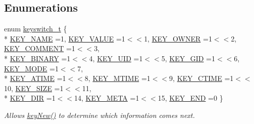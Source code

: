 \subsection*{Enumerations}
\begin{DoxyCompactItemize}
\item 
enum \hyperlink{group__key_ga91fb3178848bd682000958089abbaf40}{keyswitch\+\_\+t} \{ \\*
\hyperlink{group__key_gga91fb3178848bd682000958089abbaf40ad6127fc38f96410bf7c8f6e93b0397da}{K\+E\+Y\+\_\+\+N\+A\+M\+E} =1, 
\hyperlink{group__key_gga91fb3178848bd682000958089abbaf40ac66e4a49d09212b79f5754ca6db5bd2e}{K\+E\+Y\+\_\+\+V\+A\+L\+U\+E} =1$<$$<$1, 
\hyperlink{group__key_gga91fb3178848bd682000958089abbaf40a77ca60362fa8daca8d5347db4385068b}{K\+E\+Y\+\_\+\+O\+W\+N\+E\+R} =1$<$$<$2, 
\hyperlink{group__key_gga91fb3178848bd682000958089abbaf40ac29427bb47cc31689d02912e36161ee3}{K\+E\+Y\+\_\+\+C\+O\+M\+M\+E\+N\+T} =1$<$$<$3, 
\\*
\hyperlink{group__key_gga91fb3178848bd682000958089abbaf40a1ca18d4e094ae7487d35ecedda2235ff}{K\+E\+Y\+\_\+\+B\+I\+N\+A\+R\+Y} =1$<$$<$4, 
\hyperlink{group__key_gga91fb3178848bd682000958089abbaf40a28f01a87d65f065172f734c9c9446c0e}{K\+E\+Y\+\_\+\+U\+I\+D} =1$<$$<$5, 
\hyperlink{group__key_gga91fb3178848bd682000958089abbaf40ac0628bbaba7c837ca73323681393d15f}{K\+E\+Y\+\_\+\+G\+I\+D} =1$<$$<$6, 
\hyperlink{group__key_gga91fb3178848bd682000958089abbaf40a1b0a91ff3a855d6993930ebf0abaa518}{K\+E\+Y\+\_\+\+M\+O\+D\+E} =1$<$$<$7, 
\\*
\hyperlink{group__key_gga91fb3178848bd682000958089abbaf40af303f9ebb4983d7500ba8e06ef3ec178}{K\+E\+Y\+\_\+\+A\+T\+I\+M\+E} =1$<$$<$8, 
\hyperlink{group__key_gga91fb3178848bd682000958089abbaf40abfbab4bf55be6c53a7ffb2e43a82b355}{K\+E\+Y\+\_\+\+M\+T\+I\+M\+E} =1$<$$<$9, 
\hyperlink{group__key_gga91fb3178848bd682000958089abbaf40afbad53ecfc1512b1b49ca04b57a628b4}{K\+E\+Y\+\_\+\+C\+T\+I\+M\+E} =1$<$$<$10, 
\hyperlink{group__key_gga91fb3178848bd682000958089abbaf40a6d531b5c41445d19d0452eebdccbfa01}{K\+E\+Y\+\_\+\+S\+I\+Z\+E} =1$<$$<$11, 
\\*
\hyperlink{group__key_gga91fb3178848bd682000958089abbaf40a9e43e47c8a21478538e2d20e049981d5}{K\+E\+Y\+\_\+\+D\+I\+R} =1$<$$<$14, 
\hyperlink{group__key_gga91fb3178848bd682000958089abbaf40a040582834bb2d90049947d7ef74e87e2}{K\+E\+Y\+\_\+\+M\+E\+T\+A} =1$<$$<$15, 
\hyperlink{group__key_gga91fb3178848bd682000958089abbaf40aa8adb6fcb92dec58fb19410eacfdd403}{K\+E\+Y\+\_\+\+E\+N\+D} =0
 \}
\begin{DoxyCompactList}\small\item\em Allows \hyperlink{group__key_gad23c65b44bf48d773759e1f9a4d43b89}{key\+New()} to determine which information comes next. \end{DoxyCompactList}\item 
$$
\end{DoxyCompactItemize}
